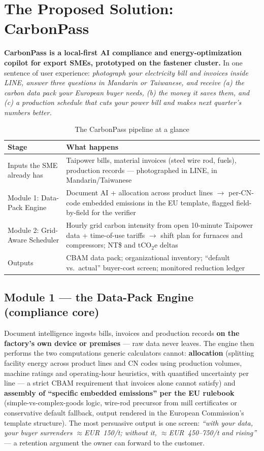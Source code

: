 \section{The Proposed Solution: CarbonPass}\label{sec:solution}

\textbf{CarbonPass is a local-first AI compliance and energy-optimization
copilot for export SMEs, prototyped on the fastener cluster.} In one sentence
of user experience: \emph{photograph your electricity bill and invoices inside
LINE, answer three questions in Mandarin or Taiwanese, and receive (a) the
carbon data pack your European buyer needs, (b) the money it saves them, and
(c) a production schedule that cuts your power bill and makes next quarter's
numbers better.}

\begin{table}[htbp]
\caption{The CarbonPass pipeline at a glance}
\label{tab:pipeline}
\small
\begin{tabularx}{\textwidth}{@{}p{}X@{}}
\toprule
\textbf{Stage} & \textbf{What happens} \\
\midrule
Inputs the SME already has & Taipower bills, material invoices (steel wire rod, fuels), production records --- photographed in LINE, in Mandarin/Taiwanese \\
Module 1: Data-Pack Engine & Document AI + allocation across product lines $\to$ per-CN-code embedded emissions in the EU template, flagged field-by-field for the verifier \\
Module 2: Grid-Aware Scheduler & Hourly grid carbon intensity from open 10-minute Taipower data + time-of-use tariffs $\to$ shift plan for furnaces and compressors; NT\$ and tCO$_2$e deltas \\
Outputs & CBAM data pack; organizational inventory; ``default vs.\ actual'' buyer-cost screen; monitored reduction ledger \\
\bottomrule
\end{tabularx}
\end{table}

\subsection{Module 1 --- the Data-Pack Engine (compliance core)}

Document intelligence ingests bills, invoices and production records
\textbf{on the factory's own device or premises} --- raw data never leaves. The
engine then performs the two computations generic calculators cannot:
\textbf{allocation} (splitting facility energy across product lines and CN
codes using production volumes, machine ratings and operating-hour heuristics,
with quantified uncertainty per line --- a strict CBAM requirement that
invoices alone cannot satisfy) and \textbf{assembly of ``specific embedded
emissions'' per the EU rulebook} (simple-vs-complex-goods logic, wire-rod
precursor from mill certificates or conservative default fallback, output
rendered in the European Commission's template structure). The most persuasive
output is one screen: \emph{``with your data, your buyer surrenders
$\approx$EUR~150/t; without it, $\approx$EUR~450--750/t and rising''} --- a
retention argument the owner can forward to the customer.

